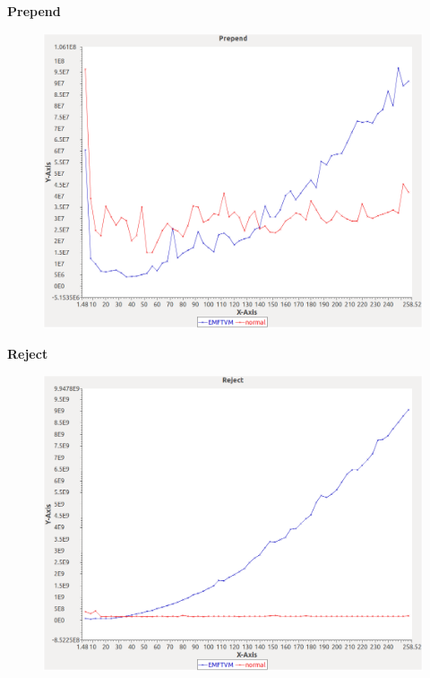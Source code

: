 \noindent\textbf{Prepend}

\begin{figure}[h]
\centering
\includegraphics[width=\textwidth]{graphs/orderedset/Prepend}
\end{figure}
\pagebreak

\noindent\textbf{Reject}

\begin{figure}[h]
\centering
\includegraphics[width=\textwidth]{graphs/orderedset/Reject}
\end{figure}
\pagebreak

